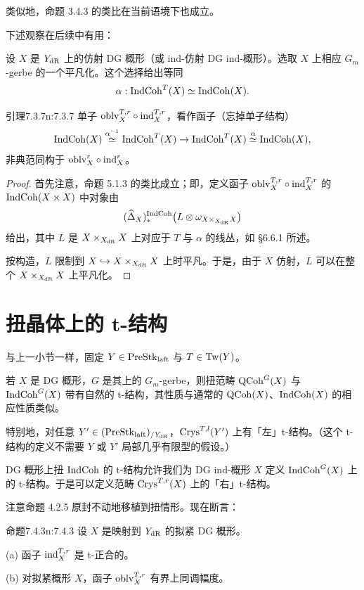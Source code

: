 类似地，命题 3.4.3 的类比在当前语境下也成立。

下述观察在后续中有用：

设 $X$ 是 $Y_{\mathrm{dR}}$ 上的仿射 DG 概形（或 ind-仿射 DG ind-概形）。选取 $X$ 上相应 $G_m$-gerbe 的一个平凡化。这个选择给出等同
\[
\alpha:\mathrm{IndCoh}^T(X)\simeq\mathrm{IndCoh}(X).
\]

\begin{othm}{引理}{7.3.7}{n:7.3.7}
单子 $\mathrm{oblv}^{T,r}_X\circ\mathrm{ind}^{T,r}_X$，看作函子（忘掉单子结构）
\[
\mathrm{IndCoh}(X)\overset{\alpha^{-1}}{\simeq}\mathrm{IndCoh}^T(X)\to\mathrm{IndCoh}^T(X)\overset{\alpha}{\simeq}\mathrm{IndCoh}(X),
\]
非典范同构于 $\mathrm{oblv}^r_X\circ\mathrm{ind}^r_X$。
\end{othm}

\begin{proof}
首先注意，命题 5.1.3 的类比成立；即，定义函子 $\mathrm{oblv}^{T,r}_X\circ\mathrm{ind}^{T,r}_X$ 的 $\mathrm{IndCoh}(X\times X)$ 中对象由
\[
(\widehat{\Delta}_X)_*^{\mathrm{IndCoh}}\big(L\otimes\omega_{X\times_{X_{\mathrm{dR}}}X}\big)
\]
给出，其中 $L$ 是 $X\times_{X_{\mathrm{dR}}}X$ 上对应于 $T$ 与 $\alpha$ 的线丛，如 §6.6.1 所述。

按构造，$L$ 限制到 $X\hookrightarrow X\times_{X_{\mathrm{dR}}}X$ 上时平凡。于是，由于 $X$ 仿射，$L$ 可以在整个 $X\times_{X_{\mathrm{dR}}}X$ 上平凡化。
\end{proof}

\section{扭晶体上的 t-结构}

与上一小节一样，固定 $Y\in\mathrm{PreStk}_{\mathrm{laft}}$ 与 $T\in\mathrm{Tw}(Y)$。

若 $X$ 是 DG 概形，$G$ 是其上的 $G_m$-gerbe，则扭范畴 $\mathrm{QCoh}^G(X)$ 与 $\mathrm{IndCoh}^G(X)$ 带有自然的 t-结构，其性质与通常的 $\mathrm{QCoh}(X)$、$\mathrm{IndCoh}(X)$ 的相应性质类似。

特别地，对任意 $Y'\in(\mathrm{PreStk}_{\mathrm{laft}})_{/Y_{\mathrm{dR}}}$，$\mathrm{Crys}^{T,l}(Y')$ 上有「左」t-结构。（这个 t-结构的定义不需要 $Y$ 或 $Y'$ 局部几乎有限型的假设。）

DG 概形上扭 $\mathrm{IndCoh}$ 的 t-结构允许我们为 DG ind-概形 $X$ 定义 $\mathrm{IndCoh}^G(X)$ 上的 t-结构。于是可以定义范畴 $\mathrm{Crys}^{T,r}(X)$ 上的「右」t-结构。

注意命题 4.2.5 原封不动地移植到扭情形。现在断言：

\begin{othm}{命题}{7.4.3}{n:7.4.3}
设 $X$ 是映射到 $Y_{\mathrm{dR}}$ 的拟紧 DG 概形。

(a) 函子 $\mathrm{ind}^{T,r}_X$ 是 t-正合的。

(b) 对拟紧概形 $X$，函子 $\mathrm{oblv}^{T,r}_X$ 有界上同调幅度。
\end{othm}

